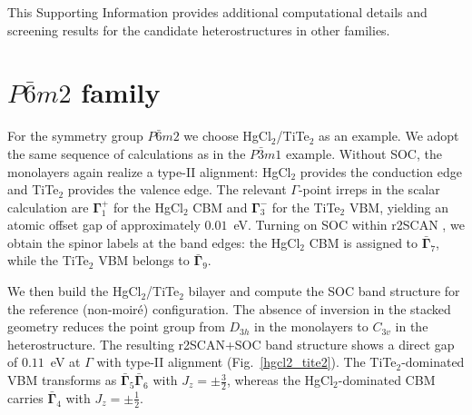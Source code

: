 \documentclass[aps, preprint, prb,]{revtex4-2}
\begin{document}
This Supporting Information provides additional computational details and screening results for the candidate heterostructures in other families.
\section{$P\bar{6}m2$ family}
For the symmetry group $P\bar{6}m2$ we choose HgCl$_2$/TiTe$_2$ as an example. We adopt the same sequence of calculations as in the $P\bar{3}m1$ example. Without SOC, the monolayers again realize a type-II alignment: HgCl$_2$ provides the conduction edge and TiTe$_2$ provides the valence edge. The relevant $\Gamma$-point irreps in the scalar calculation are $\mathbf{\Gamma}_1^+$ for the HgCl$_2$ CBM and $\mathbf{\Gamma}_3^-$ for the TiTe$_2$ VBM, yielding an atomic offset gap of approximately $0.01$~eV. Turning on SOC within r2SCAN \cite{furness2020accurate}, we obtain the spinor labels at the band edges: the HgCl$_2$ CBM is assigned to $\bar{\mathbf{\Gamma}}_7$, while the TiTe$_2$ VBM belongs to $\bar{\mathbf{\Gamma}}_9$.

We then build the HgCl$_2$/TiTe$_2$ bilayer and compute the SOC band structure for the reference (non-moir\'e) configuration. The absence of inversion in the stacked geometry reduces the point group from $D_{3h}$ in the monolayers to $C_{3v}$ in the heterostructure. The resulting r2SCAN+SOC band structure shows a direct gap of $0.11$~eV at $\Gamma$ with type-II alignment (Fig.~\ref{hgcl2_tite2}). The TiTe$_2$-dominated VBM transforms as $\bar{\mathbf{\Gamma}}_5 \bar{\mathbf{\Gamma}}_6$ with $J_z=\pm \frac{3}{2}$, whereas the HgCl$_2$-dominated CBM carries $\bar{\mathbf{\Gamma}}_4$ with $J_z=\pm \frac{1}{2}$.
\end{document}
